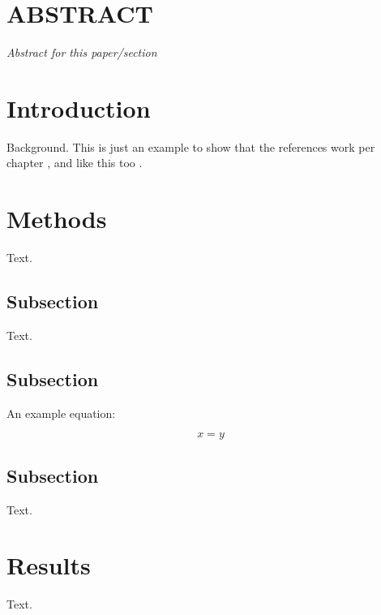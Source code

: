 \newpage
\normalsize
\doublespacing
\renewcommand{\thechapter}{\arabic{chapter}}
\section*{ABSTRACT} 
\textit{Abstract for this paper/section}

\section{Introduction}
Background. This is just an example to show that the references work per chapter \cite{book2}, and like this too \cite{article2}.

\section{Methods}

Text.

\subsection{Subsection}

Text.

\subsection{Subsection}

An example equation:

\begin{equation}
x = y
\end{equation}

\subsection{Subsection}

Text.

\section{Results}
Text.

